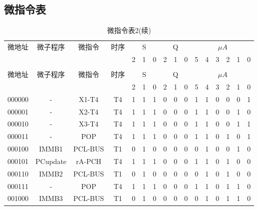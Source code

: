 \documentclass[10pt]{book}
\begin{document}
\subsection{微指令表}
\begin{longtable}{|c|c|c|c||c|c|c||c|c|c||c|c|c|c|c|c|}
\caption{微指令表2} \label{tb_micro_prog4} \\
\hline
\multirow{2}{1.5cm}{微地址} & \multirow{2}{1.5cm}{微子程序} & \multirow{2}{1.5cm}{微指令} & \multirow{2}{1.0cm}{时序} &  \multicolumn{3}{c||}{S} & \multicolumn{3}{c||}{Q} & \multicolumn {6}{c|}{$\mu A$} \\
\cline{5-16}
                          &           &  &  & 2 & 1 & 0 &  2 & 1 & 0  & 5 & 4 & 3 & 2 & 1 & 0 \\
\hline
\endfirsthead
\caption{微指令表2(续)} \\
\hline
\multirow{2}{1.5cm}{微地址} & \multirow{2}{1.5cm}{微子程序} & \multirow{2}{1.5cm}{微指令} & \multirow{2}{1.0cm}{时序} & \multicolumn{3}{c||}{S} &\multicolumn{3}{c||}{Q} & \multicolumn {6}{c|}{$\mu A$} \\
\cline{5-16}
                          &           &  &  & 2 & 1 & 0 &  2 & 1 & 0  & 5 & 4 & 3 & 2 & 1 & 0 \\
\hline
\endhead
\hline
\endfoot
000000 & - 		& X1-T4 		& T4   & 1 & 1 & 1  & 0 & 0 & 0  & 1 & 1 & 0 & 0 & 0 & 1 \\
000001 & - 		& X2-T4		& T4   & 1 & 1 & 1  & 0 & 0 & 0  & 1 & 1 & 0 & 0 & 1 & 0 \\
000010 & - 		& X3-T4		& T4   & 1 & 1 & 1  & 0 & 0 & 0  & 1 & 1 & 0 & 0 & 1 & 1 \\
000011 & - 		& POP			& T4   & 1 & 1 & 1  & 0 & 0 & 0  & 1 & 1 & 0 & 1 & 0 & 1 \\
000100 & IMMB1		& PCL-BUS		& T1   & 0 & 1 & 0  & 0 & 0 & 0  & 0 & 1 & 0 & 0 & 1 & 0 \\
000101 & PCupdate	& rA-PCH		& T4   & 1 & 1 & 1  & 0 & 0 & 0  & 1 & 1 & 0 & 1 & 0 & 0 \\
000110 & IMMB2		& PCL-BUS 		& T1   & 0 & 1 & 0  & 0 & 0 & 0  & 0 & 1 & 0 & 1 & 0 & 0 \\
000111 & - 		& POP			& T4   & 1 & 1 & 1  & 0 & 0 & 0  & 1 & 1 & 0 & 1 & 1 & 0 \\
\hline
001000 & IMMB3 		& PCL-BUS		& T1   & 0 & 1 & 0  & 0 & 0 & 0  & 0 & 1 & 0 & 1 & 1 & 0 \\

\end{longtable}
\end{document}
